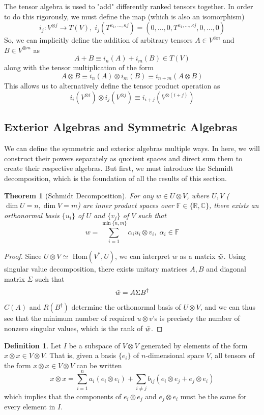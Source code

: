 \documentclass{article}
\newtheorem{theorem}{Theorem}[section]
\theoremstyle{remark}
\theoremstyle{definition}
\newtheorem{definition}{Definition}[section]
\begin{document}
The tensor algebra is used to "add" differently ranked tensors together. In order to do this rigorously, we must define the map (which is also an isomorphism)
\[i_j: V^{\otimes j} \longrightarrow T(V), \; i_j (T^{\kappa_1, ..., \kappa j}) = (0, ...,0, T^{\kappa_1, ..., \kappa j}, 0, ..., 0) \]
So, we can implicitly define the addition of arbitrary tensors $A \in V^{\otimes n}$ and $B \in V^{\otimes m}$ as 
\[ A + B \equiv i_n (A) + i_m (B) \in T(V)\]
along with the tensor multiplication of the form
\[ A \otimes B \equiv i_n(A) \otimes i_m(B) \equiv i_{n+m} (A \otimes B)\]
This allows us to alternatively define the tensor product operation as
\[i_i(V^{\otimes i}) \otimes i_j( V^{\otimes j}) \equiv i_{i+j} (V^{\otimes (i+j)})\]

\subsection{Exterior Algebras and Symmetric Algebras}
We can define the symmetric and exterior algebras multiple ways. In here, we will construct their powers separately as quotient spaces and direct sum them to create their respective algebras. But first, we must introduce the Schmidt decomposition, which is the foundation of all the results of this section. 

\begin{theorem}[Schmidt Decomposition]
For any $w \in U \otimes V$, where $U, V$ ($\dim{U} = n, \dim{V} = m$)  are inner product spaces over $\mathbb{F} \in \{ \mathbb{R}, \mathbb{C}\}$, there exists an orthonormal basis $\{u_i\}$ of $U$ and $\{v_j\}$ of $V$ such that 
\[ w = \sum_{i=1}^{\min{\{n, m\}}} \alpha_i u_i \otimes v_i, \; \alpha_i \in \mathbb{F}\]
\end{theorem}
\begin{proof}
Since $U \otimes V \simeq $ Hom$(V^*, U)$, we can interpret $w$ as a matrix $\Tilde{w}$. Using singular value decomposition, there exists unitary matrices $A, B$ and diagonal matrix $\Sigma$ such that
\[\Tilde{w} = A \Sigma B^\dagger\]
$C(A)$ and $R(B^\dagger)$ determine the orthonormal basis of $U \otimes V$, and we can thus see that the minimum number of required $u \otimes v$'s is precisely the number of nonzero singular values, which is the rank of $\Tilde{w}$. 

\end{proof}

\begin{definition}
Let $I$ be a subspace of $V \otimes V$ generated by elements of the form $x \otimes x \in V \otimes V$. That is, given a basis $\{e_i\}$ of $n$-dimensional space $V$, all tensors of the form $x \otimes x \in V \otimes V$ can be written 
\[x \otimes x = \sum_{i=1}^n a_i (e_i \otimes e_i) + \sum_{i \neq j} b_{i j} (e_i \otimes e_j + e_j \otimes e_i)\]
which implies that the components of $e_i \otimes e_j$ and $e_j \otimes e_i$ must be the same for every element in $I$. 
\end{definition}
\end{document}
